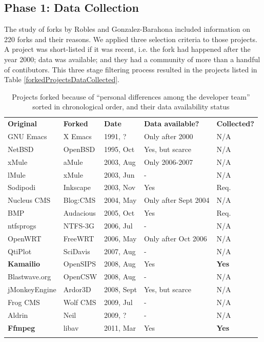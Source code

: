 \documentclass[conference]{IEEEtran}
\begin{document}
\subsection{Phase 1: Data Collection}

The study of forks by Robles and Gonzalez-Barahona \cite{Robles} included information on 220 forks and their reasons. We applied three selection criteria to those projects. A project was short-listed if it was recent, i.e. the fork had happened after the year 2000; data was available; and they had a community of more than a handful of contibutors. This three stage filtering process resulted in the projects listed in Table \ref{forkedProjectsDataCollected}. \\

\begin{table}[!htbp]
\centering
\caption{Projects forked because of ``personal differences among the developer team'' \cite{Robles} sorted in chronological order, and their data availability status}
\label{tabelProjectsForkedCat1PersonalDiffereces}       %
\begin{tabular}{m{} m{} m{} m{} m{}}
\hline\noalign{\smallskip}
\textbf{Original} & \textbf{Forked} & \textbf{Date} & \textbf{Data available?} & \textbf{Collected?}\\
\noalign{\smallskip}\hline\noalign{\smallskip}
GNU Emacs & X Emacs & 1991, ? & Only after 2000 & N/A \\ \hline
NetBSD & OpenBSD & 1995, Oct & Yes, but scarce & N/A \\ \hline
xMule & aMule & 2003, Aug & Only 2006-2007 & N/A \\ \hline
lMule & xMule & 2003, Jun & - & N/A \\ \hline
Sodipodi & Inkscape & 2003, Nov & Yes & Req.\\ \hline
Nucleus CMS & Blog:CMS & 2004, May & Only after Sept 2004 & N/A \\ \hline
BMP & Audacious & 2005, Oct & Yes & Req. \\ \hline
ntfsprogs & NTFS-3G & 2006, Jul & - & N/A \\ \hline
OpenWRT & FreeWRT & 2006, May & Only after Oct 2006 & N/A \\ \hline
QtiPlot & SciDavis & 2007, Aug & - & N/A \\ \hline
\textbf{Kamailio} & OpenSIPS & 2008, Aug & Yes & \textbf{Yes} \\ \hline
Blastwave.org & OpenCSW & 2008, Aug & - & N/A \\ \hline
jMonkeyEngine & Ardor3D & 2008, Sept & Yes, but scarce & N/A \\ \hline
Frog CMS & Wolf CMS & 2009, Jul & - & N/A \\ \hline
Aldrin & Neil & 2009, ? & - & N/A \\ \hline
\textbf{Ffmpeg} & libav & 2011, Mar & Yes & \textbf{Yes}\\
\noalign{\smallskip}\hline
\end{tabular}
\end{table}
\end{document}
